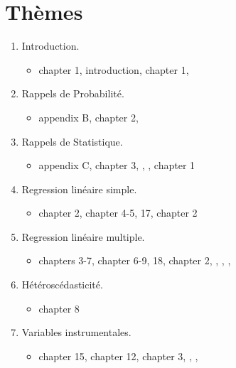 \section*{Thèmes}
\begin{enumerate}
\item Introduction.
\begin{itemize}
  \item \cite{w2013} chapter 1, \cite{ap2014} introduction,
    \cite{sw2009} chapter 1,
    \cite{burtless1985}
  \end{itemize}
\item Rappels de Probabilité.
 \begin{itemize}
  \item \cite{w2013} appendix B, \cite{sw2009} chapter 2, \cite{menzel2009}
  \end{itemize}
  \item Rappels de Statistique.
   \begin{itemize}
  \item \cite{w2013} appendix C, \cite{sw2009} chapter 3, \cite{menzel2009},
    \cite{woodbury1987}, \cite{ap2014} chapter 1
  \end{itemize}
\item Regression linéaire simple.
  \begin{itemize}
  \item \cite{w2013} chapter 2, \cite{sw2009} chapter 4-5, 17, \cite{ap2014} chapter 2
  \end{itemize}
\item Regression linéaire multiple.
  \begin{itemize}
  \item \cite{w2013} chapters 3-7, \cite{sw2009} chapter 6-9, 18, \cite{ap2014} chapter 2, \cite{krueger1993},
    \cite{dinardo1997}, \cite{dale2002}, \cite{card1997myth}
  \end{itemize}
\item Hétéroscédasticité. 
  \begin{itemize}
  \item \cite{w2013} chapter 8
  \end{itemize}
\item Variables instrumentales.
  \begin{itemize}
  \item \cite{w2013} chapter 15,  \cite{sw2009} chapter 12, \cite{ap2014} chapter 3, \cite{angrist1990},
    \cite{angrist1991}, \cite{ashenfelter1994}
  \end{itemize}
\end{enumerate}

